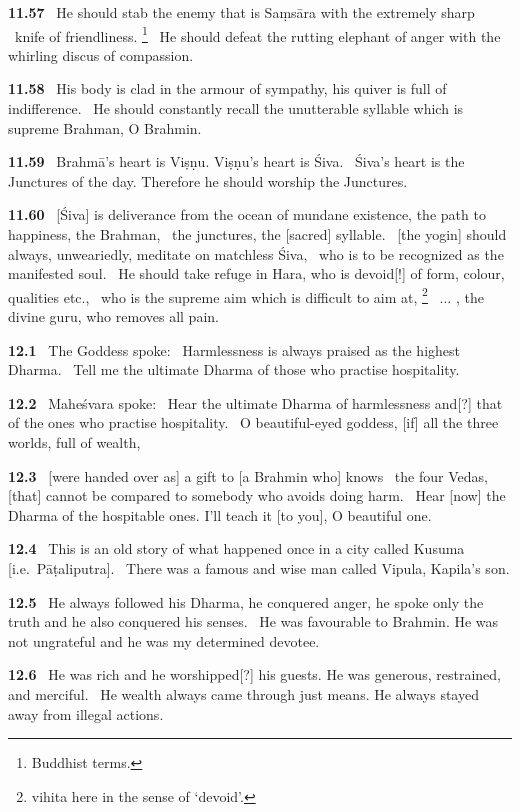 \documentclass{article}
\begin{document}
\textbf{11.57}%
\ He should stab the enemy that is Saṃsāra with the extremely sharp%
\                  knife of friendliness.%
\footnote{Buddhist terms. }%
\ He should defeat the rutting elephant of anger with the whirling discus of compassion.%


\textbf{11.58}%
\ His body is clad in the armour of sympathy, his quiver is full of indifference.%
\ He should constantly recall the unutterable syllable which is supreme Brahman, O Brahmin.%


\textbf{11.59}%
\ Brahmā's heart is Viṣṇu. Viṣṇu's heart is Śiva.%
\ Śiva's heart is the Junctures of the day. Therefore he should worship the Junctures.%


\textbf{11.60}%
\ [Śiva] is deliverance from the ocean of mundane existence, the path to happiness, the Brahman,%
\                  the junctures, the [sacred] syllable.%
\ [the yogin] should always, unweariedly, meditate on matchless Śiva,%
\              who is to be recognized as the manifested soul.%
\ He should take refuge in Hara, who is devoid[!] of form, colour, qualities etc.,%
\              who is the supreme aim which is difficult to aim at,%
\footnote{vihita here in the sense of `devoid'. }%
\ ... , the divine guru, who removes all pain.%


\textbf{12.1}%
\ The Goddess spoke:%
\ Harmlessness is always praised as the highest Dharma.%
\ Tell me the ultimate Dharma of those who practise hospitality.%


\textbf{12.2}%
\ Maheśvara spoke:%
\ Hear the ultimate Dharma of harmlessness and[?] that of the ones who practise hospitality.%
\ O beautiful-eyed goddess, [if] all the three worlds, full of wealth,%


\textbf{12.3}%
\ [were handed over as] a gift to [a Brahmin who] knows%
\                 the four Vedas, [that] cannot be compared to somebody who avoids doing harm.%
\ Hear [now] the Dharma of the hospitable ones. I'll teach it [to you], O beautiful one.%


\textbf{12.4}%
\ This is an old story of what happened once in a city called Kusuma [i.e.\ Pāṭaliputra].%
\ There was a famous and wise man called Vipula, Kapila's son.%


\textbf{12.5}%
\ He always followed his Dharma, he conquered anger, he spoke only the truth and he also conquered his senses.%
\ He was favourable to Brahmin. He was not ungrateful and he was my determined devotee.%


\textbf{12.6}%
\ He was rich and he worshipped[?] his guests. He was generous, restrained, and merciful.%
\ He wealth always came through just means. He always stayed away from illegal actions.%
\end{document}
